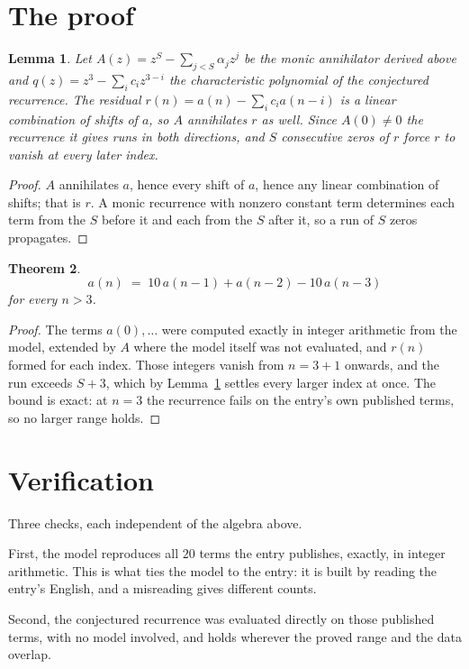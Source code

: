 \documentclass[11pt,a4paper]{article}
\theoremstyle{plain}
\newtheorem{theorem}{Theorem}
\newtheorem{lemma}[theorem]{Lemma}
\theoremstyle{definition}
\begin{document}
\section{The proof}

\begin{lemma}\label{lem:crit}
Let $A(z)=z^S-\sum_{j<S}\alpha_jz^{j}$ be the monic annihilator derived above and
$q(z)=z^{3}-\sum_ic_iz^{3-i}$ the characteristic polynomial of the conjectured
recurrence. The residual $r(n)=a(n)-\sum_ic_ia(n-i)$ is a linear combination of shifts of $a$,
so $A$ annihilates $r$ as well. Since $A(0)\ne0$ the recurrence it gives runs in both
directions, and $S$ consecutive zeros of $r$ force $r$ to vanish at every later index.
\end{lemma}

\begin{proof}
$A$ annihilates $a$, hence every shift of $a$, hence any linear combination of shifts; that is
$r$. A monic recurrence with nonzero constant term determines each term from the $S$ before it
and each from the $S$ after it, so a run of $S$ zeros propagates.
\end{proof}

\begin{theorem}
\[
a(n)\;=\;10\,a(n-1) + a(n-2) - 10\,a(n-3)
\]
for every $n>3$.
\end{theorem}

\begin{proof}
The terms $a(0),\dots$ were computed exactly in integer arithmetic from the model, extended by
$A$ where the model itself was not evaluated, and $r(n)$ formed for each index. Those integers
vanish from $n=3+1$ onwards, and the run exceeds $S+3$, which by
Lemma~\ref{lem:crit} settles every larger index at once. The bound is exact: at $n=3$ the recurrence fails on the entry's own published terms, so no larger range holds.
\end{proof}

\section{Verification}

Three checks, each independent of the algebra above.

First, the model reproduces all $20$ terms the entry publishes, exactly, in integer
arithmetic. This is what ties the model to the entry: it is built by reading the entry's
English, and a misreading gives different counts.

Second, the conjectured recurrence was evaluated directly on those published terms, with no
model involved, and holds wherever the proved range and the data overlap.
\end{document}
